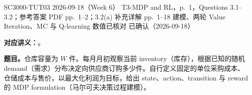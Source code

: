 
\label{tutorial:SC3000-TUT03}

\tutorialmeta
  {SC3000-TUT03}
  {2026-09-18（Week 6）}
  {T3-MDP and RL，p.~1，Questions 3.1--3.2；参考答案 PDF pp.~1--2；3.2(a) 补充详解 pp.~1--18}
  {建模、两轮 Value Iteration、MC 与 Q-learning 数值已核对}
  {已确认（2026-09-18）}


\textbf{对应讲义：}。

\textbf{题目。}仓库容量为 $W$ 件。每月月初观察当前 inventory（库存），根据已知的随机 demand（需求）分布决定向供应商订购多少件。自行定义固定的单位采购成本、仓储成本与售价，以最大化利润为目标，给出 state、action、transition 与 reward 的 MDP formulation（马尔可夫决策过程建模）。

